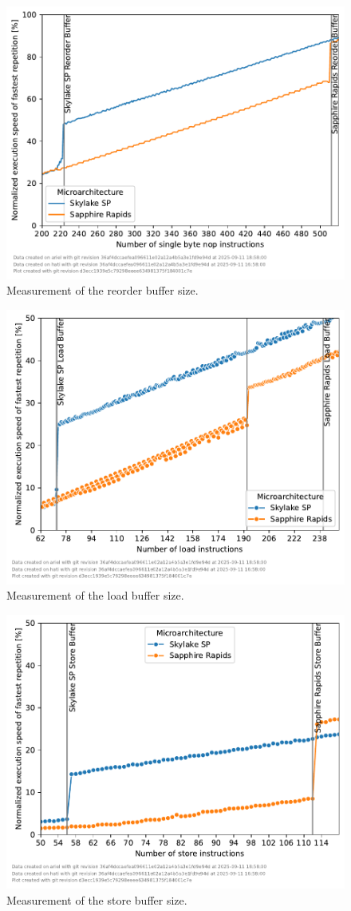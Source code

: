 \begin{figure}[]
    \centering
    \includegraphics[width=0.8\columnwidth]{fig/robsize/reorder-buffer.pdf}
    \caption{\label{fig:robsize-reorder}Measurement of the reorder buffer size.}
\end{figure}
\begin{figure}[]
    \centering
    \includegraphics[width=0.8\columnwidth]{fig/robsize/load-buffer.pdf}
    \caption{\label{fig:robsize-load}Measurement of the load buffer size.}
\end{figure}
\begin{figure}[]
    \centering
    \includegraphics[width=0.8\columnwidth]{fig/robsize/store-buffer.pdf}
    \caption{\label{fig:robsize-store}Measurement of the store buffer size.}
\end{figure}

